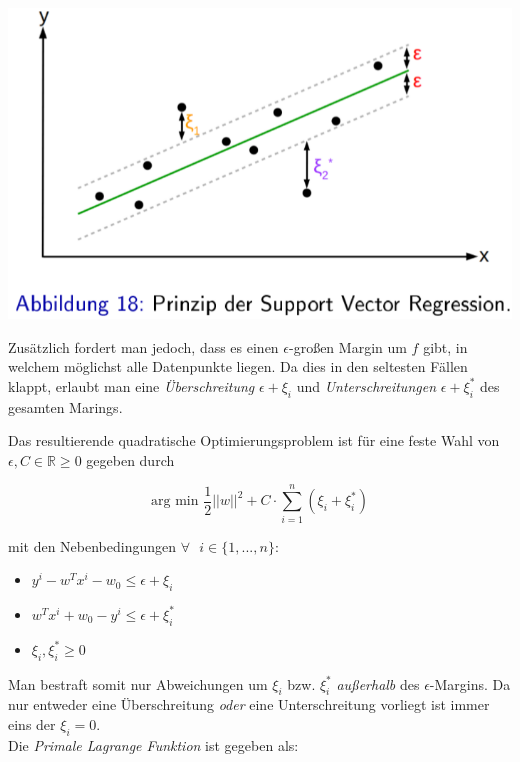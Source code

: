 \documentclass{report}
\begin{document}
  \begin{center}	
    \includegraphics[scale=.285]{ml06_18}	
  \end{center}	
  
  Zusätzlich fordert man jedoch, dass es einen $\epsilon$-großen Margin um $f$ gibt, in welchem möglichst alle	
  Datenpunkte liegen. Da dies in den seltesten Fällen klappt, erlaubt man eine \textit{Überschreitung} $\epsilon + \xi_i$ und 	
  \textit{Unterschreitungen} $\epsilon + \xi_i^*$ des gesamten Marings.\par	
  
  Das resultierende quadratische Optimierungsproblem ist für eine feste Wahl von $\epsilon, C\in \mathbb{R} \geq 0$ gegeben durch	
  
  $$\text{arg min }\frac{1}{2}||w||^2 + C\cdot \sum_{i=1}^n(\xi_i + \xi_i^*)$$	
  
  mit den Nebenbedingungen $\forall\text{ }i\in\{1, ..., n\}$:\\	
  \vspace*{-1.5em}	
  \begin{itemize}	
    \item $y^i - w^Tx^i - w_0 \leq \epsilon + \xi_i$	
    \item $w^Tx^i + w_0 - y^i\leq \epsilon + \xi_i^*$	
    \item $\xi_i, \xi_i^* \geq 0$	
  \end{itemize}	
  
  Man bestraft somit nur Abweichungen um $\xi_i$ bzw. $\xi_i^*$ \textit{außerhalb} des $\epsilon$-Margins.	
  Da nur entweder eine Überschreitung \textit{oder} eine Unterschreitung vorliegt ist immer eins der $\xi_i = 0$.\\	
  Die \textit{Primale Lagrange Funktion} ist gegeben als:	
  
\end{document}
